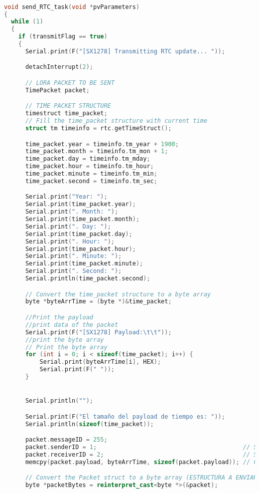 \begin{lstlisting}[language=C++, caption=Creación de tareas en FreeRTOS]

void send_RTC_task(void *pvParameters)
{
  while (1)
  {
    if (transmitFlag == true)
    {
      Serial.print(F("[SX1278] Transmitting RTC update... "));

      detachInterrupt(2);

      // LORA PACKET TO BE SENT
      TimePacket packet;

      // TIME PACKET STRUCTURE
      timestruct time_packet;
      // Fill the time_packet structure with current time
      struct tm timeinfo = rtc.getTimeStruct();

      time_packet.year = timeinfo.tm_year + 1900;
      time_packet.month = timeinfo.tm_mon + 1;
      time_packet.day = timeinfo.tm_mday;
      time_packet.hour = timeinfo.tm_hour;
      time_packet.minute = timeinfo.tm_min;
      time_packet.second = timeinfo.tm_sec;

      Serial.print("Year: ");
      Serial.print(time_packet.year);
      Serial.print(". Month: ");
      Serial.print(time_packet.month);
      Serial.print(". Day: ");
      Serial.print(time_packet.day);
      Serial.print(". Hour: ");
      Serial.print(time_packet.hour);
      Serial.print(". Minute: ");
      Serial.print(time_packet.minute);
      Serial.print(". Second: ");
      Serial.println(time_packet.second);

      // Convert the time_packet structure to a byte array
      byte *byteArrTime = (byte *)&time_packet;

      //Print the payload
      //print data of the packet
      Serial.print(F("[SX1278] Payload:\t\t"));
      //print the byte array
      // Print the byte array
      for (int i = 0; i < sizeof(time_packet); i++) {
          Serial.print(byteArrTime[i], HEX);
          Serial.print(F(" "));
      }


      Serial.println("");

      Serial.print(F("El tamaño del payload de tiempo es: "));
      Serial.println(sizeof(time_packet));

      packet.messageID = 255;
      packet.senderID = 1;                                         // Set your sender ID
      packet.receiverID = 2;                                       // Set the intended receiver ID
      memcpy(packet.payload, byteArrTime, sizeof(packet.payload)); // Copy the byte array into the payload

      // Convert the Packet struct to a byte array (ESTRUCTURA A ENVIAR POR LORA)
      byte *packetBytes = reinterpret_cast<byte *>(&packet);


\end{lstlisting}
